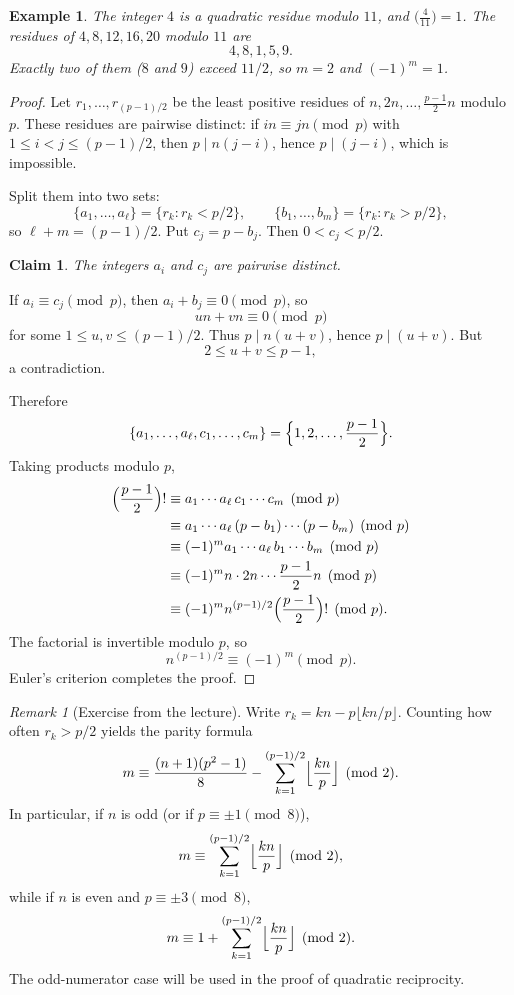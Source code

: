 \documentclass[11pt]{article}
\newtheorem{example}[theorem]{Example}
\newtheorem{claim}[theorem]{Claim}
\theoremstyle{remark}
\newtheorem*{remark}{Remark}
\begin{document}
\begin{example}
The integer $4$ is a quadratic residue modulo $11$, and $\bigl(\frac{4}{11}\bigr)=1$.
The residues of $4,8,12,16,20$ modulo $11$ are
\[
    4,8,1,5,9.
\]
Exactly two of them ($8$ and $9$) exceed $11/2$, so $m=2$ and
$(-1)^m=1$.
\end{example}

\begin{proof}
Let $r_1,\ldots,r_{(p-1)/2}$ be the least positive residues of
$n,2n,\ldots,\frac{p-1}{2}n$ modulo $p$. These residues are pairwise distinct:
if $in\equiv jn\pmod p$ with $1\le i<j\le(p-1)/2$, then $p\mid n(j-i)$, hence
$p\mid(j-i)$, which is impossible.

Split them into two sets:
\[
    \{a_1,\ldots,a_\ell\}
    =
    \{r_k:r_k<p/2\},
    \qquad
    \{b_1,\ldots,b_m\}
    =
    \{r_k:r_k>p/2\},
\]
so $\ell+m=(p-1)/2$. Put $c_j=p-b_j$. Then $0<c_j<p/2$.

\begin{claim}
The integers $a_i$ and $c_j$ are pairwise distinct.
\end{claim}

If $a_i\equiv c_j\pmod p$, then $a_i+b_j\equiv 0\pmod p$, so
\[
    un+vn\equiv 0\pmod p
\]
for some $1\le u,v\le(p-1)/2$. Thus $p\mid n(u+v)$, hence $p\mid(u+v)$. But
\[
    2\le u+v\le p-1,
\]
a contradiction.

Therefore
\[
    \{a_1,\ldots,a_\ell,c_1,\ldots,c_m\}
    =
    \Bigl\{1,2,\ldots,\frac{p-1}{2}\Bigr\}.
\]
Taking products modulo $p$,
\begin{align*}
    \Bigl(\frac{p-1}{2}\Bigr)!
    &\equiv
    a_1\cdots a_\ell\,c_1\cdots c_m
    \pmod p\\
    &\equiv
    a_1\cdots a_\ell\,(p-b_1)\cdots(p-b_m)
    \pmod p\\
    &\equiv
    (-1)^m a_1\cdots a_\ell\,b_1\cdots b_m
    \pmod p\\
    &\equiv
    (-1)^m n\cdot 2n\cdots\frac{p-1}{2}n
    \pmod p\\
    &\equiv
    (-1)^m n^{(p-1)/2}\Bigl(\frac{p-1}{2}\Bigr)!
    \pmod p.
\end{align*}
The factorial is invertible modulo $p$, so
\[
    n^{(p-1)/2}\equiv(-1)^m\pmod p.
\]
Euler's criterion completes the proof.
\end{proof}

\begin{remark}[Exercise from the lecture]
Write $r_k=kn-p\bigl\lfloor kn/p\bigr\rfloor$. Counting how often $r_k>p/2$
yields the parity formula
\[
    m
    \equiv
    \frac{(n+1)(p^2-1)}{8}
    -
    \sum_{k=1}^{(p-1)/2}
    \Bigl\lfloor\frac{kn}{p}\Bigr\rfloor
    \pmod 2.
\]
In particular, if $n$ is odd (or if $p\equiv\pm 1\pmod 8$),
\[
    m
    \equiv
    \sum_{k=1}^{(p-1)/2}
    \Bigl\lfloor\frac{kn}{p}\Bigr\rfloor
    \pmod 2,
\]
while if $n$ is even and $p\equiv\pm 3\pmod 8$,
\[
    m
    \equiv
    1
    +
    \sum_{k=1}^{(p-1)/2}
    \Bigl\lfloor\frac{kn}{p}\Bigr\rfloor
    \pmod 2.
\]
The odd-numerator case will be used in the proof of quadratic reciprocity.
\end{remark}
\end{document}
